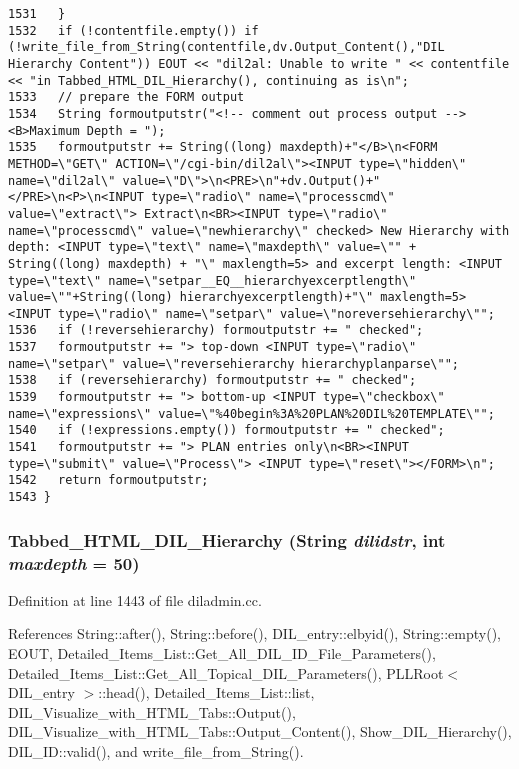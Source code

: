 \begin{verbatim}
1531   }
1532   if (!contentfile.empty()) if (!write_file_from_String(contentfile,dv.Output_Content(),"DIL Hierarchy Content")) EOUT << "dil2al: Unable to write " << contentfile << "in Tabbed_HTML_DIL_Hierarchy(), continuing as is\n";
1533   // prepare the FORM output
1534   String formoutputstr("<!-- comment out process output --><B>Maximum Depth = ");
1535   formoutputstr += String((long) maxdepth)+"</B>\n<FORM METHOD=\"GET\" ACTION=\"/cgi-bin/dil2al\"><INPUT type=\"hidden\" name=\"dil2al\" value=\"D\">\n<PRE>\n"+dv.Output()+"</PRE>\n<P>\n<INPUT type=\"radio\" name=\"processcmd\" value=\"extract\"> Extract\n<BR><INPUT type=\"radio\" name=\"processcmd\" value=\"newhierarchy\" checked> New Hierarchy with depth: <INPUT type=\"text\" name=\"maxdepth\" value=\"" + String((long) maxdepth) + "\" maxlength=5> and excerpt length: <INPUT type=\"text\" name=\"setpar__EQ__hierarchyexcerptlength\" value=\""+String((long) hierarchyexcerptlength)+"\" maxlength=5> <INPUT type=\"radio\" name=\"setpar\" value=\"noreversehierarchy\"";
1536   if (!reversehierarchy) formoutputstr += " checked";
1537   formoutputstr += "> top-down <INPUT type=\"radio\" name=\"setpar\" value=\"reversehierarchy hierarchyplanparse\"";
1538   if (reversehierarchy) formoutputstr += " checked";
1539   formoutputstr += "> bottom-up <INPUT type=\"checkbox\" name=\"expressions\" value=\"%40begin%3A%20PLAN%20DIL%20TEMPLATE\"";
1540   if (!expressions.empty()) formoutputstr += " checked";
1541   formoutputstr += "> PLAN entries only\n<BR><INPUT type=\"submit\" value=\"Process\"> <INPUT type=\"reset\"></FORM>\n";
1542   return formoutputstr;
1543 }
\end{verbatim}\normalsize 
{}
\subsubsection{ Tabbed\_\-HTML\_\-DIL\_\-Hierarchy ({\bf String} {\em dilidstr}, int {\em maxdepth} = 50)}\label{dil2al_8hh_a313}




Definition at line 1443 of file diladmin.cc.

References String::after(), String::before(), DIL\_\-entry::elbyid(), String::empty(), EOUT, Detailed\_\-Items\_\-List::Get\_\-All\_\-DIL\_\-ID\_\-File\_\-Parameters(), Detailed\_\-Items\_\-List::Get\_\-All\_\-Topical\_\-DIL\_\-Parameters(), PLLRoot$<$ DIL\_\-entry $>$::head(), Detailed\_\-Items\_\-List::list, DIL\_\-Visualize\_\-with\_\-HTML\_\-Tabs::Output(), DIL\_\-Visualize\_\-with\_\-HTML\_\-Tabs::Output\_\-Content(), Show\_\-DIL\_\-Hierarchy(), DIL\_\-ID::valid(), and write\_\-file\_\-from\_\-String().

